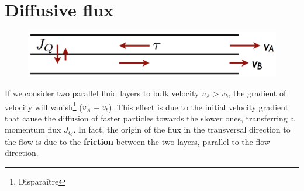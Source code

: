 \section{Diffusive flux}
	\begin{figure}
	\vspace{-5mm}
	\includegraphics[scale=0.26]{ch1/4}
	\end{figure}
	If we consider two parallel fluid layers to bulk velocity $v_A > v_b$, the gradient of velocity will vanish\footnote{Disparaître} ($v_A = v_b$). This effect is due to the initial velocity gradient that cause the diffusion of faster particles towards the slower ones, transferring a momentum flux $J_Q$. In fact, the origin of the flux in the transversal direction to the flow is due to the \textbf{friction} between the two layers, parallel to the flow direction. 
	
